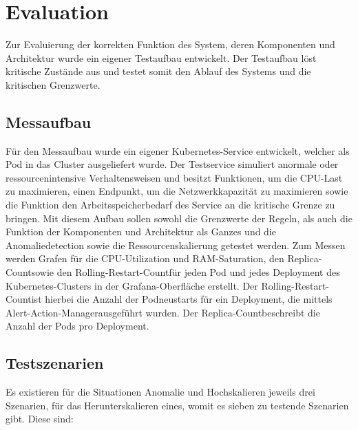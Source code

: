 \documentclass[a4paper,10pt]{scrartcl}
\begin{document}
\section{Evaluation}

Zur Evaluierung der korrekten Funktion des System, deren Komponenten und Architektur wurde ein eigener Testaufbau entwickelt. Der Testaufbau löst kritische Zustände aus und testet somit den Ablauf des Systems und die kritischen Grenzwerte.

\subsection{Messaufbau}

Für den Messaufbau wurde ein eigener Kubernetes-Service entwickelt, welcher als Pod in das Cluster ausgeliefert wurde. Der Testservice simuliert anormale oder ressourcenintensive Verhaltensweisen und besitzt Funktionen, um die CPU-Last zu maximieren, einen Endpunkt, um die Netzwerkkapazität zu maximieren sowie die Funktion den Arbeitsspeicherbedarf des Service an die kritische Grenze zu bringen.
Mit diesem Aufbau sollen sowohl die Grenzwerte der Regeln, als auch die Funktion der Komponenten und Architektur als Ganzes und die Anomaliedetection sowie die Ressourcenskalierung getestet werden.
Zum Messen werden Grafen für die CPU-Utilization und RAM-Saturation, den \glqq Replica-Count\grqq sowie den \glqq Rolling-Restart-Count\grqq für jeden Pod und jedes Deployment des Kubernetes-Clusters in der Grafana-Oberfläche erstellt. Der \glqq Rolling-Restart-Count\grqq ist hierbei die Anzahl der Podneustarts für ein Deployment, die mittels \glqq Alert-Action-Manager\grqq ausgeführt wurden. Der \glqq Replica-Count\grqq beschreibt die Anzahl der Pods pro Deployment.

\subsection{Testszenarien}

Es existieren für die Situationen Anomalie und Hochskalieren jeweils drei Szenarien, für das Herunterskalieren eines, womit es sieben zu testende Szenarien gibt.
Diese sind:
\end{document}
